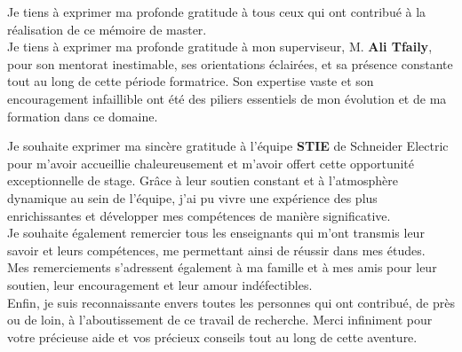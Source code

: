 

Je tiens à exprimer ma profonde gratitude à tous ceux qui ont contribué à la
réalisation de ce mémoire de master.\\


Je tiens à exprimer ma profonde gratitude à mon superviseur, M. \textbf{
Ali Tfaily}, pour son mentorat inestimable, ses orientations éclairées, et sa
présence constante tout au long de cette période formatrice. Son expertise
vaste et son encouragement infaillible ont été des piliers essentiels de mon
évolution et de ma formation dans ce domaine.




Je souhaite exprimer ma sincère gratitude à l'équipe \textbf{STIE} de Schneider
Electric pour m'avoir accueillie chaleureusement et m'avoir offert cette
opportunité exceptionnelle de stage. Grâce à leur soutien constant et à
l'atmosphère dynamique au sein de l'équipe, j'ai pu vivre une expérience des
plus enrichissantes et développer mes compétences de manière significative.\\



Je souhaite également remercier tous les enseignants qui m'ont transmis leur
savoir et leurs compétences, me permettant ainsi de réussir dans mes études.\\


Mes remerciements s'adressent également à ma famille et à mes amis pour leur
soutien, leur encouragement et leur amour indéfectibles.\\

Enfin, je suis reconnaissante envers toutes les personnes qui ont contribué, de
près ou de loin, à l'aboutissement de ce travail de recherche. Merci infiniment
pour votre précieuse aide et vos précieux conseils tout au long de cette
aventure.

\clearpage